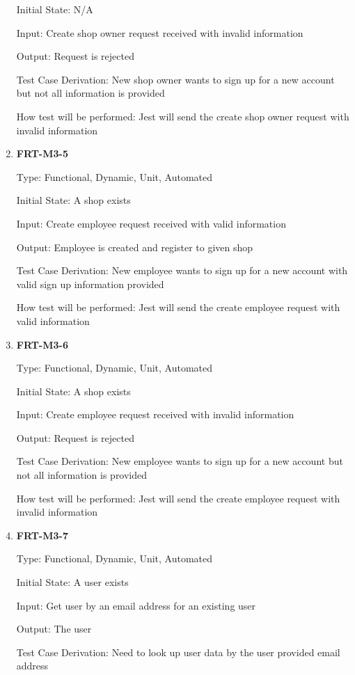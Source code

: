 \documentclass[12pt, titlepage]{article}
\begin{document}
\begin{enumerate}
	      Initial State: N/A

	      Input: Create shop owner request received with invalid information

	      Output: Request is rejected

	      Test Case Derivation: New shop owner wants to sign up for a new account but not all information is
	      provided

	      How test will be performed: Jest will send the create shop owner request with invalid information

	\item \textbf{FRT-M3-5}

	      Type: Functional, Dynamic, Unit, Automated

	      Initial State: A shop exists

	      Input: Create employee request received with valid information

	      Output: Employee is created and register to given shop

	      Test Case Derivation: New employee wants to sign up for a new account with valid sign up
	      information provided

	      How test will be performed: Jest will send the create employee request with valid information

	\item \textbf{FRT-M3-6}

	      Type: Functional, Dynamic, Unit, Automated

	      Initial State: A shop exists

	      Input: Create employee request received with invalid information

	      Output: Request is rejected

	      Test Case Derivation: New employee wants to sign up for a new account but not all information is
	      provided

	      How test will be performed: Jest will send the create employee request with invalid information

	\item \textbf{FRT-M3-7}

	      Type: Functional, Dynamic, Unit, Automated

	      Initial State: A user exists

	      Input: Get user by an email address for an existing user

	      Output: The user

	      Test Case Derivation: Need to look up user data by the user provided email address


\end{enumerate}
\end{document}
